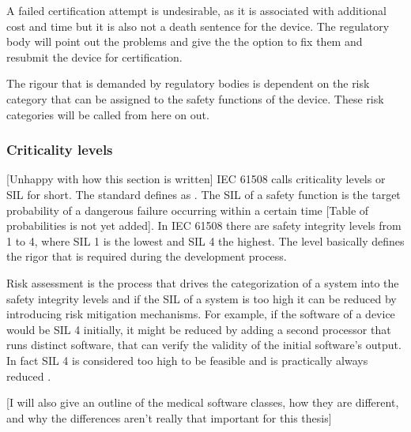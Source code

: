 A failed certification attempt is undesirable, as it is associated with additional cost and time but it is also not a death sentence for the device. The regulatory body will point out the problems and give the \mfg{} the option to fix them and resubmit the device for certification.

The rigour that is demanded by regulatory bodies is dependent on the risk category that can be assigned to the safety functions of the device. These risk categories will be called  from here on out. 

\subsubsection{Criticality levels}
[Unhappy with how this section is written]
IEC 61508 calls criticality levels  or  \gls{SIL} for short. The standard defines  as \cite{IEC.2010-1}. The SIL of a safety function is the target probability of a dangerous failure occurring within a certain time [Table of probabilities is not yet added]. In IEC 61508 there are safety integrity levels from 1 to 4, where SIL 1 is the lowest and SIL 4 the highest. The level basically defines the rigor that is required during the development process.

Risk assessment is the process that drives the categorization of a system into the safety integrity levels and if the SIL of a system is too high it can be reduced by introducing risk mitigation mechanisms. For example, if the software of a device would be SIL 4 initially, it might be reduced by adding a second processor that runs distinct software, that can verify the validity of the initial software's output.  In fact SIL 4 is considered too high to be feasible and is practically always reduced \cite{MTLInstrumentsGroup.March2002}.

[I will also give an outline of the medical software classes, how they are different, and why the differences aren't really that important for this thesis]

